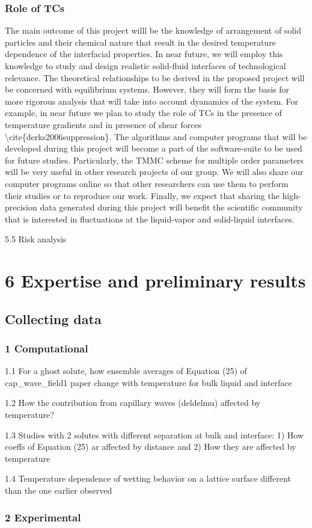 \subsubsection{Role of TCs}

\par The main outcome of this project willl be the knowledge of arrangement of solid particles and their chemical nature that result in the desired temperature dependence of the interfacial properties. In near future, we will employ this knowledge to study and design realistic solid-fluid interfaces of technological relevance. The theoretical relationships to be derived in the proposed project will be concerned with equilibrium systems. However, they will form the basis for more rigorous analysis that will take into account dyanamics of the system. For example, in near future we plan to study the role of TCs in the presence of temperature gradients and in presence of shear forces \textbackslash cite\{derks2006suppression\}. The algorithms and computer programs that will be developed during this project will become a part of the software-suite to be used for future studies. Particularly, the TMMC scheme for multiple order parameters will be very useful in other research projects of our group. We will also share our computer programs online so that other researchers can use them to perform their studies or to reproduce our work. Finally, we expect that sharing the high-precision data generated during this project will benefit the scientific community that is interested in fluctuations at the liquid-vapor and solid-liquid interfaces.
\par 5.5 Risk analysis\section{6 Expertise and preliminary results}
\subsection{Collecting data}
\subsubsection{1 Computational}

\par 1.1 For a ghost solute, how ensemble averages of Equation (25) of cap\_wave\_field1 paper change with temperature for bulk liquid and interface
\par 1.2 How the contribution from capillary waves (deldelmu) affected by temperature?
\par 1.3 Studies with 2 solutes with different separation at bulk and interface: 1) How coeffs of Equation (25) ar affected by distance and 2) How they are affected by temperature
\par 1.4 Temperature dependence of wetting behavior on a lattice surface different than the one earlier observed\subsubsection{2 Experimental}

